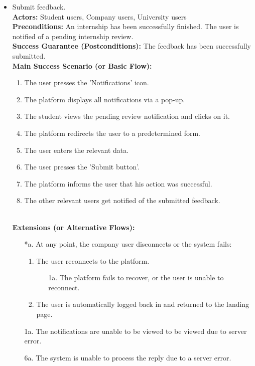 \begin{itemize}[label={[\textbf{UC}]}, align=left, leftmargin=*]
    \item {} Submit feedback. \\
    \textbf{Actors:} Student users, Company users, University users\\
     \textbf{Preconditions:} An internship has been successfully finished. The user is notified of a pending internship review.\\
     \textbf{Success Guarantee (Postconditions):} The feedback has been successfully submitted. \\
     \textbf{Main Success Scenario (or Basic Flow):} 
     \begin{enumerate}[label=\arabic*.] 
        \item The user presses the 'Notifications' icon.
        \item The platform displays all notifications via a pop-up.
        \item The student views the pending review notification and clicks on it.
        \item The platform redirects the user to a predetermined form.
        \item The user enters the relevant data.
        \item The user presses the 'Submit button'.
        \item The platform informs the user that his action was successful.
        \item The other relevant users get notified of the submitted feedback.
     \end{enumerate} \\

    \textbf{Extensions (or Alternative Flows):} 
    \begin{enumerate}[label=\arabic*.]
        \item[*a.] At any point, the company user disconnects or the system fails:
            \begin{enumerate}[label=\arabic*.]
                \item The user reconnects to the platform.
                    \begin{enumerate}[label=\alph*.]
                        \item[1a.] The platform fails to recover, or the user is unable to reconnect.
                    \end{enumerate}
                 \item The user is automatically logged back in and returned to the landing page.
            \end{enumerate}
        \item[1a.] The notifications are unable to be viewed to be viewed due to server error.
        \item[6a.] The system is unable to process the reply due to a server error. 
        \end{enumerate}


\end{itemize}
